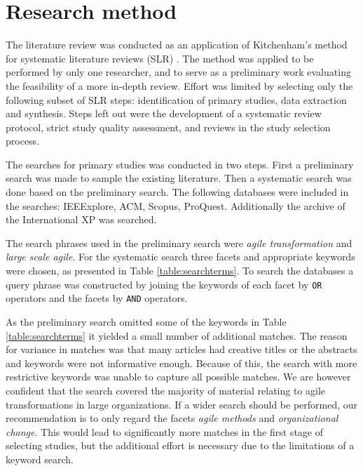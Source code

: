 \documentclass[lnbip]{svmultln}
\begin{document}
\section{Research method}
\label{sec:method}

%
%
%


The literature review was conducted as an application of Kitchenham's
method for systematic literature reviews (SLR) . The method
was applied to be performed by only one researcher, and to serve as a
preliminary work evaluating the feasibility of a more in-depth review.
Effort was limited by selecting only the following subset of SLR steps:
identification of primary studies, data extraction and synthesis. Steps left out
were the development of a systematic review protocol, strict study quality
assessment, and reviews in the study selection process.

The searches for primary studies was conducted in two steps. First a preliminary
search was made to sample the existing literature. Then a systematic search was
done based on the preliminary search. The following databases were included in
the searches: IEEExplore, ACM, Scopus, ProQuest. Additionally the archive of the
International XP was searched.

The search phrases used in the preliminary search were \textit{agile
transformation} and \textit{large scale agile}. For the systematic search three
facets and appropriate keywords were chosen, as presented in Table
\ref{table:searchterms}. To search the databases a query phrase was constructed
by joining the keywords of each facet by \texttt{OR} operators and the facets by
\texttt{AND} operators.

As the preliminary search omitted some of the keywords in Table
\ref{table:searchterms} it yielded a small number of additional matches. The
reason for variance in matches was that many articles had creative titles or the
abstracts and keywords were not informative enough. Because of this, the search
with more restrictive keywords was unable to capture all possible matches.
We are however confident that the search covered the majority of material
relating to agile transformations in large organizations. If a wider search
should be performed, our recommendation is to only regard the facets
\textit{agile methods} and \textit{organizational change}. This would lead to
significantly more matches in the first stage of selecting studies, but the
additional effort is necessary due to the limitations of a keyword search.
\end{document}
